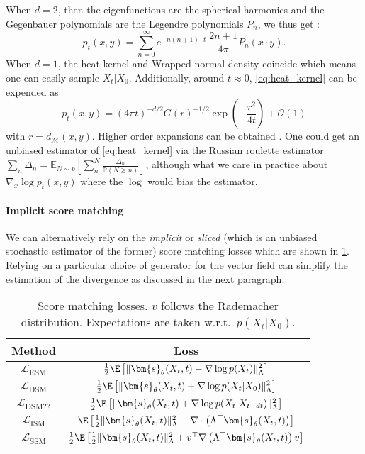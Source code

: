 When $d=2$, then the eigenfunctions are the spherical harmonics and the Gegenbauer polynomials are the Legendre polynomials $P_n$, we thus get \citep{jammalamadaka2019Harmonic,mardia2000Directional}: 
$$p_t(x, y) = \sum^\infty_{n=0} e^{- n(n+1) \cdot t } ~\frac{2n + 1}{4 \pi} P_n(x \cdot y).$$
When $d=1$, the heat kernel and Wrapped normal density coincide which means one can easily sample $X_t|X_0$.
Additionally, around $t \approx 0$, \cref{eq:heat_kernel} can be expended as
$$p_t(x, y) = (4\pi t)^{-d/2} G(r)^{-1/2} \exp \left(-\frac{r^2}{4t}\right) + \mathcal{O}(1)$$
with $r=d_\mathcal{M}(x,y)$.
Higher order expansions can be obtained \cite{rey2019diffusion,zhao2018Exact}.
One could get an unbiased estimator of \cref{eq:heat_kernel} via the Russian roulette estimator $\sum_n \Delta_n = \mathbb{E}_{N \sim p} \left[ \sum^N_n \frac{\Delta_n}{\mathbb{P}(N \ge n)} \right]$, although what we care in practice about $\nabla_x \log p_t(x, y)$ where the $\log$ would bias the estimator.



\paragraph{Implicit score matching}
We can alternatively rely on the \emph{implicit} or \emph{sliced} (which is an unbiased stochastic estimator of the former) score matching losses which are shown in \cref{tab:sm_losses}.
Relying on a particular choice of generator for the vector field can simplify the estimation of the divergence as discussed in the next paragraph.

\begin{table}[h]
\centering
\begin{tabular}{cc}
\toprule
Method                     & Loss \\ \hline
$\mathcal{L}_{\text{ESM}}$ &  $\frac{1}{2} \E \left[ \| \bm{s}_\theta(X_t, t) - \nabla \log p(X_t) \|^2_\Lambda \right]$    \\
$\mathcal{L}_{\text{DSM}}$ &  $\frac{1}{2} \E \left[ \| \bm{s}_\theta(X_t, t) + \nabla \log p(X_t|X_0) \|^2_\Lambda \right]$ \\
$\mathcal{L}_{\text{DSM??}}$ &  $\frac{1}{2} \E \left[ \| \bm{s}_\theta(X_t, t) + \nabla \log p(X_t|X_{t-dt}) \|^2_\Lambda \right]$ \\
$\mathcal{L}_{\text{ISM}}$ &  $\E \left[\frac{1}{2} \| \bm{s}_\theta(X_t, t)\|^2_\Lambda + \nabla \cdot \left(\Lambda^\top \bm{s}_\theta(X_t, t) \right) \right]$    \\
$\mathcal{L}_{\text{SSM}}$ &  $\frac{1}{2} \E \left[\frac{1}{2} \| \bm{s}_\theta(X_t, t)\|^2_\Lambda + v^\top \nabla \left(\Lambda^\top \bm{s}_\theta(X_t, t) \right) v \right]$    \\
\bottomrule
\end{tabular}
\caption{Score matching losses. $v$ follows the Rademacher distribution. Expectations are taken w.r.t.\ $p(X_t|X_0)$.}
\label{tab:sm_losses}
\end{table}


